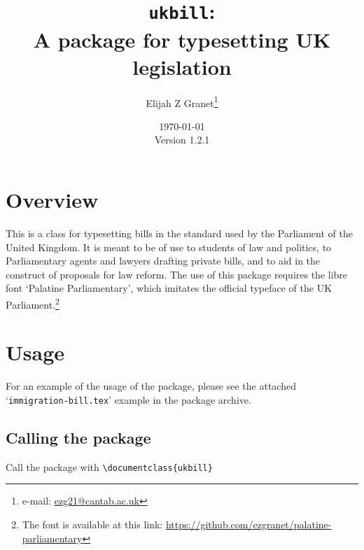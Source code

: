 \documentclass{article}
\date{\today\\\smallskip\ttfamily Version 1.2.1}
\author{Elijah Z Granet\thanks{e-mail: \href{mailto:ezg21@cantab.ac.uk}{\ttfamily ezg21@cantab.ac.uk}}}
\title{\texttt{ukbill}:\\A package for typesetting UK legislation}
\begin{document}
\maketitle
\tableofcontents
\clearpage
\section{Overview}
This is a class for typesetting bills in the standard used by the Parliament of the United Kingdom. It is meant to be of use to students of law and politics, to Parliamentary agents and lawyers drafting private bills, and to aid in the construct of proposals for law reform. The use of this package requires the libre font `Palatine Parliamentary', which imitates the official typeface of the UK Parliament.\footnote{The font is available at this link: \url{https://github.com/ezgranet/palatine-parliamentary}}
\section{Usage}
For an example of the usage of the package, please see the attached `\texttt{immigration-bill.tex}' example in the package archive.

\subsection{Calling the package}
Call the package with {\color{darkspringgreen}\ttfamily \verb|\documentclass{ukbill}|}
\end{document}
